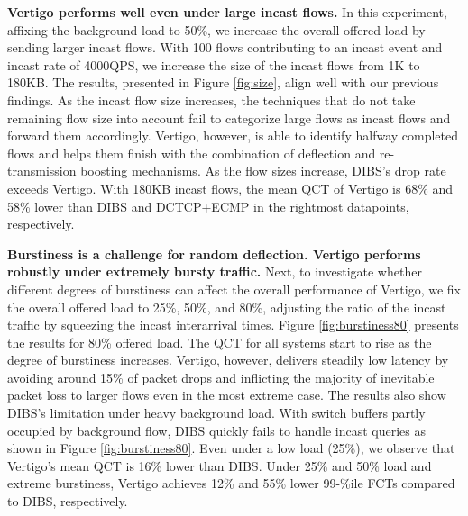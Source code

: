 \textbf{Vertigo performs well even under large incast flows.}
In this experiment, affixing the background load to 50\%, we increase the overall offered load by sending larger incast flows. With 100 flows contributing to an incast event and incast rate of 4000QPS, we increase the size of the incast flows from 1K to 180KB. The results, presented in Figure \ref{fig:size}, align well with our previous findings. As the incast flow size increases, the techniques that do not take remaining flow size into account fail to categorize large flows as incast flows and forward them accordingly. Vertigo, however, is able to identify halfway completed flows and helps them finish with the combination of deflection and re-transmission boosting mechanisms. 
As the flow sizes increase, DIBS's drop rate exceeds Vertigo. With 180KB incast flows, the mean QCT of Vertigo is 68\% and 58\% lower than DIBS and DCTCP+ECMP in the rightmost datapoints, respectively.




\textbf{Burstiness is a challenge for random deflection. Vertigo performs robustly under extremely bursty traffic.}
Next, to investigate whether different degrees of burstiness can affect the overall performance of Vertigo, we fix the overall offered load to 25\%, 50\%, and 80\%, adjusting the ratio of the incast traffic by squeezing the incast interarrival times. Figure \ref{fig:burstiness80} presents the results for 80\% offered load. The QCT for all systems start to rise
as the degree of burstiness increases. Vertigo, however, delivers steadily low latency by avoiding around 15\% of packet drops and inflicting the majority of inevitable packet loss to larger flows even in the most extreme case. The results also show DIBS's limitation under heavy background load. With switch buffers partly occupied by background flow, DIBS quickly fails to handle incast queries as shown in Figure \ref{fig:burstiness80}. 
Even under a low load (25\%), we observe that Vertigo's mean QCT is 16\% lower than DIBS.
Under 25\% and 50\% load and extreme burstiness, Vertigo achieves 12\% and 55\% lower 99-\%ile FCTs compared to DIBS, respectively. 


